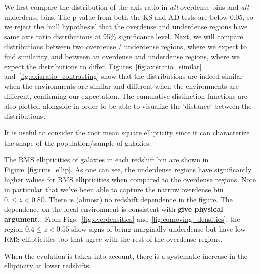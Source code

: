 \documentclass[twocolumn,useAMS,usenatbib]{mn2e}
\begin{document}
We first compare the distribution of the axis ratio in \emph{all} overdense bins and \emph{all} underdense bins. The p-value from both the KS and AD tests are below 0.05, 
so we reject the `null hypothesis' that the overdense and underdense regions have same axis ratio distributions at 95\% significance level.
Next, we will compare distributions between two overdense / underdense regions, where we expect to find similarity, and between an overdense and underdense regions,
where we expect the distributions to differ.
Figures~\ref{fig:axisratio_similar} and~\ref{fig:axisratio_contrasting} show that the distributions are indeed similar when the environments are similar and different when the environments are different, confirming our expectation.
The cumulative distinction functions are also plotted alongside in order to be able to visualize the `distance' between the distributions.


It is useful to consider the root mean square ellipticity since it can characterize the shape of the population/sample of galaxies.

The RMS ellipticities of galaxies in each redshift bin are shown in Figure~\ref{fig:rms_ellip}. As one can see, the underdense regions
have significantly higher values for RMS ellipticities when compared to the overdense regions. Note in particular that we've been able to capture the narrow overdense bin $0.\le z < 0.80$.  
There is (almost) no redshift dependence in the figure.
The dependence on the local environment is consistent with {\bf give physical argument.}. 
From Figs.~\ref{fig:overdensities} and~\ref{fig:comoving_densities},
the region $0.4\le z < 0.55$ show signs of being marginally underdense but have low RMS ellipticities too that agree with the rest of the overdense regions.

When the evolution is taken into account, there is a systematic increase in the ellipticity at lower redshifts. 
\end{document}
